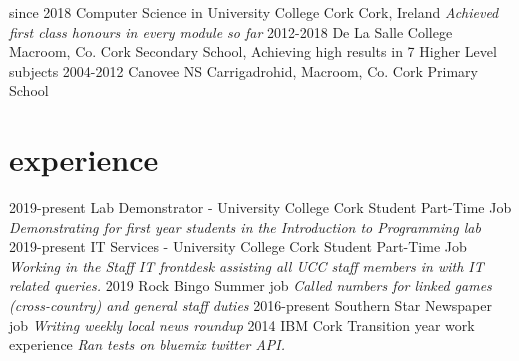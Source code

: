 \documentclass[10pt]{friggeri-cv}
\begin{document}
\begin{entrylist}
  \entry
    {since 2018}
    {Computer Science in {\normalfont University College Cork}}
    {Cork, Ireland}
    {\emph{Achieved first class honours in every module so far}}
  \entry
    {2012-2018}
    {De La Salle College}
    {Macroom, Co. Cork}
    {Secondary School, Achieving high results in 7 Higher Level subjects}
  \entry
    {2004-2012}
    {Canovee NS}
    {Carrigadrohid, Macroom, Co. Cork}
    {Primary School}
\end{entrylist}
\newline\newline\newline
\section{experience}

\begin{entrylist}
  \entry
    {2019-present}
    {Lab Demonstrator - {\normalfont University College Cork}}
    {Student Part-Time Job}
    {\emph{Demonstrating for first year students in the \textit{Introduction to Programming} lab}}
  \entry
    {2019-present}
    {IT Services - {\normalfont University College Cork}}
    {Student Part-Time Job}
    {\emph{Working in the Staff IT frontdesk assisting all UCC staff members in with IT related queries.}}
  \entry
    {2019}
    {Rock Bingo}
    {Summer job}
    {\emph{Called numbers for linked games (cross-country) and general staff duties}}
  \entry
    {2016-present}
    {Southern Star}
    {Newspaper job}
    {\emph{Writing weekly local news roundup}}
  \entry
    {2014}
    {IBM Cork}
    {Transition year work experience}
    {\emph{Ran tests on bluemix twitter API.}}
\end{entrylist}
\end{document}
